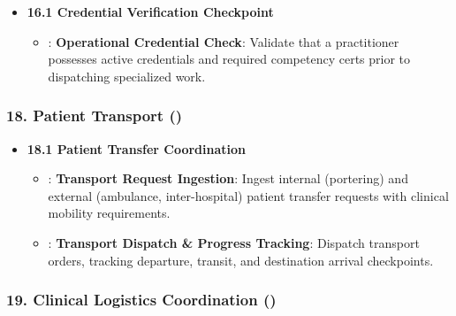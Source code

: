 \begin{itemize}

\item 
\textbf{16.1 Credential Verification Checkpoint}


\begin{itemize}

\item 
\texttt{}: \textbf{Operational Credential Check}: Validate that a practitioner possesses active credentials and required competency certs prior to dispatching specialized work.



\end{itemize}


\end{itemize}
\label{rad:enabling:543}
\subsubsection*{18. Patient Transport (\texttt{})}
\label{rad:enabling:544}

\begin{itemize}

\item 
\textbf{18.1 Patient Transfer Coordination}


\begin{itemize}

\item 
\texttt{}: \textbf{Transport Request Ingestion}: Ingest internal (portering) and external (ambulance, inter-hospital) patient transfer requests with clinical mobility requirements.



\item 
\texttt{}: \textbf{Transport Dispatch \& Progress Tracking}: Dispatch transport orders, tracking departure, transit, and destination arrival checkpoints.



\end{itemize}


\end{itemize}
\label{rad:enabling:548}
\subsubsection*{19. Clinical Logistics Coordination (\texttt{})}
\label{rad:enabling:549}

